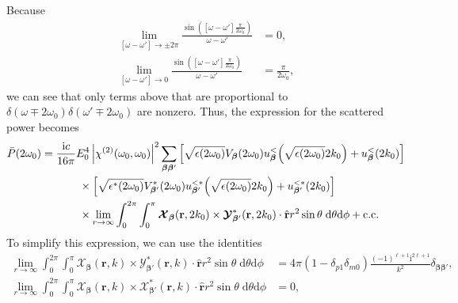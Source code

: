 \documentclass{article}
\begin{document}
Because
\begin{equation}
\begin{split}
\lim_{[\omega - \omega']\to\pm2\pi}\frac{\sin([\omega - \omega']\frac{\pi}{2\omega_0})}{\omega - \omega'} &= 0,\\
\lim_{[\omega - \omega']\to0}\frac{\sin([\omega - \omega']\frac{\pi}{2\omega_0})}{\omega - \omega'} &= \frac{\pi}{2\omega_0},
\end{split}
\end{equation}
we can see that only terms above that are proportional to $\delta(\omega\mp2\omega_0)\delta(\omega'\mp2\omega_0)$ are nonzero. Thus, the expression for the scattered power becomes
\begin{equation}
\begin{split}
\bar{P}(2\omega_0) &= \frac{\mathrm{i}c}{16\pi}E_0^4\left|\chi^{(2)}(\omega_0,\omega_0)\right|^2\sum_{\bm{\beta}\bm{\beta}'}\left[\sqrt{\epsilon(2\omega_0)}V_{\bm{\beta}}(2\omega_0)u_{\bm{\beta}}^<\!\left(\sqrt{\epsilon(2\omega_0)}2k_0\right) + u_{\bm{\beta}}^<(2k_0)\right]\\ 
&\hspace{0.1\textwidth}\times\left[\sqrt{\epsilon^*(2\omega_0)}V_{\bm{\beta}'}^*(2\omega_0)u_{\bm{\beta}'}^{<*}\!\left(\sqrt{\epsilon(2\omega_0)}2k_0\right) + u_{\bm{\beta}'}^{<*}(2k_0)\right]\\
&\hspace{0.1\textwidth}\times\lim_{r\to\infty}\int_0^{2\pi}\int_0^\pi\bm{\mathcal{X}}_{\bm{\beta}}(\mathbf{r},2k_0)\times\bm{\mathcal{Y}}_{\bm{\beta}'}^*(\mathbf{r},2k_0)\cdot\hat{\mathbf{r}}r^2\sin\theta\;\mathrm{d}\theta\mathrm{d}\phi + \mathrm{c.c.}
\end{split}
\end{equation}
To simplify this expression, we can use the identities
\begin{equation}
\begin{split}
\lim_{r\to\infty}\int_0^{2\pi}\int_0^\pi\bm{\mathcal{X}}_{\bm{\beta}}(\mathbf{r},k)\times\bm{\mathcal{Y}}_{\bm{\beta}'}^*(\mathbf{r},k)\cdot\hat{\mathbf{r}}r^2\sin\theta\;\mathrm{d}\theta\mathrm{d}\phi &= 4\pi(1 - \delta_{p1}\delta_{m0})\frac{(-1)^{\ell + 1}\mathrm{i}^{2\ell + 1}}{k^2}\delta_{\bm{\beta}\bm{\beta}'},\\
\lim_{r\to\infty}\int_0^{2\pi}\int_0^\pi\bm{\mathcal{X}}_{\bm{\beta}}(\mathbf{r},k)\times\bm{\mathcal{X}}_{\bm{\beta}'}^*(\mathbf{r},k)\cdot\hat{\mathbf{r}}r^2\sin\theta\;\mathrm{d}\theta\mathrm{d}\phi &= 0,
\end{split}
\end{equation}
\end{document}
